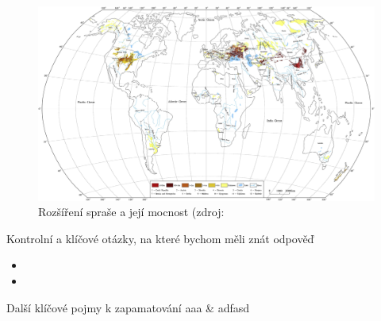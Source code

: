 \begin{landscape}
	\begin{figure}
		\centering
		\includegraphics[width=1\linewidth]{obrazky/eolicka/loes_distr}
		\caption{Rozšíření spraše a její mocnost (zdroj: \textcite{liLoessGenesisWorldwide2020}}
		\label{fig:spras_distribuce}
	\end{figure}
\end{landscape}


\newpage
\onecolumn
\begin{boxotazky}{Kontrolní a klíčové otázky, na které bychom měli znát odpověď}
	\begin{itemize}
		\item 
		\item 
		
	\end{itemize}
\end{boxotazky}

\begin{boxslovnik}{Další klíčové pojmy k zapamatování}
	aaa & adfasd \\
	
\end{boxslovnik}
\twocolumn